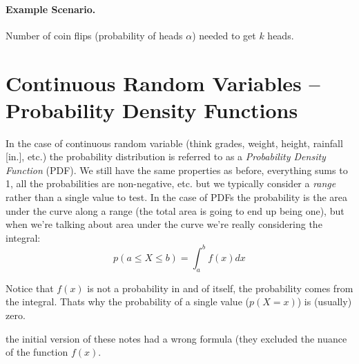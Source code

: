 \paragraph{Example Scenario.} Number of coin flips (probability of heads $\alpha$) needed to get $k$ heads. 

\begin{center}
\end{center}

\section{Continuous Random Variables -- Probability Density Functions}
In the case of continuous random variable (think grades, weight, height, rainfall [in.], etc.) 
the probability distribution is referred to as a \emph{Probability Density Function} (PDF). 
We still have the same properties as before, everything sums to 1, all the probabilities are non-negative, etc.
but we typically consider a \textit{range} rather than a single value to test. 
In the case of PDFs the probability is the area under the curve along a range (the total area is going to end up being one), 
but when we're talking about area under the curve we're really considering the integral:
\[p(a \le X \le b) = \int_{a}^{b} f(x)dx \]

Notice that $f(x)$ is not a probability in and of itself, the probability comes from the integral. 
Thats why the probability of a single value ($p(X=x)$) is (usually) zero. 

\begin{aside}
the initial version of these notes had a wrong formula (they excluded the nuance of the function $f(x)$. 
\end{aside}

